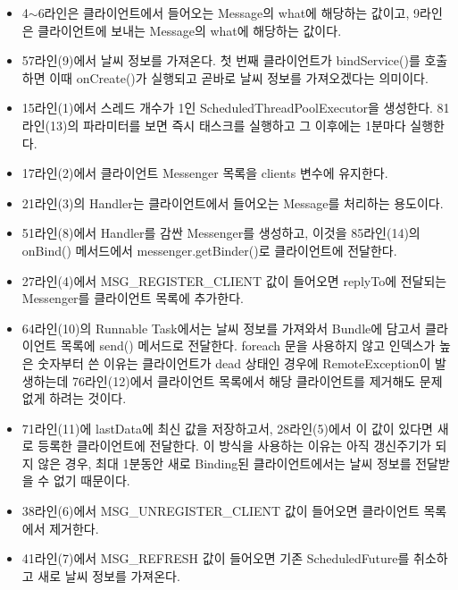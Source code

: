 \begin{itemize}
\item 4$\sim$6라인은 클라이언트에서 들어오는 Message의 what에 해당하는 값이고, 9라인은 클라이언트에 보내는 Message의 what에 해당하는 값이다.

\item 57라인(9)에서 날씨 정보를 가져온다. 첫 번째 클라이언트가 bindService()를 호출하면 이때 onCreate()가 실행되고 곧바로 날씨 정보를 가져오겠다는 의미이다.

\item 15라인(1)에서 스레드 개수가 1인 ScheduledThreadPoolExecutor을 생성한다. 81라인(13)의 파라미터를 보면 즉시 태스크를 실행하고 그 이후에는 1분마다 실행한다.

\item 17라인(2)에서 클라이언트 Messenger 목록을 clients 변수에 유지한다.

\item 21라인(3)의 Handler는 클라이언트에서 들어오는 Message를 처리하는 용도이다.

\item 51라인(8)에서 Handler를 감싼 Messenger를 생성하고, 이것을 85라인(14)의 onBind() 메서드에서 messenger.getBinder()로 클라이언트에 전달한다.

\item 27라인(4)에서 MSG\_REGISTER\_CLIENT 값이 들어오면 replyTo에 전달되는 Messenger를 클라이언트 목록에 추가한다.

\item 64라인(10)의 Runnable Task에서는 날씨 정보를 가져와서 Bundle에 담고서 클라이언트 목록에 send() 메서드로 전달한다. 
foreach 문을 사용하지 않고 인덱스가 높은 숫자부터 쓴 이유는 클라이언트가 dead 상태인 경우에 RemoteException이 발생하는데 76라인(12)에서 클라이언트 목록에서 해당 클라이언트를 제거해도 문제 없게 하려는 것이다.

\item 71라인(11)에 lastData에 최신 값을 저장하고서, 28라인(5)에서 이 값이 있다면 새로 등록한 클라이언트에 전달한다. 이 방식을 사용하는 이유는 아직 갱신주기가 되지 않은 경우, 최대 1분동안 새로 Binding된 클라이언트에서는 날씨 정보를 전달받을 수 없기 때문이다.

\item 38라인(6)에서 MSG\_UNREGISTER\_CLIENT 값이 들어오면 클라이언트 목록에서 제거한다.

\item 41라인(7)에서 MSG\_REFRESH 값이 들어오면 기존 ScheduledFuture를 취소하고 새로 날씨 정보를 가져온다.
\end{itemize}

